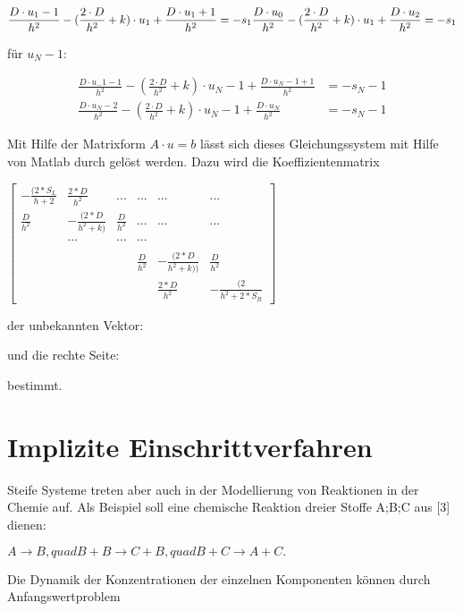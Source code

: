 \begin{equation}
	\frac{D\cdot u_1-1}{h^2}-(\frac{2\cdot D}{h^2} + k)\cdot u_1  + \frac{D\cdot u_1+1}{h^2} = -s_1\\
	\frac{D\cdot u_0}{h^2}-(\frac{2\cdot D}{h^2} + k)\cdot u_1  + \frac{D\cdot u_2}{h^2} = -s_1\\
\end{equation}

für $ u_N-1$:

\begin{align*}
	\frac{D\cdot u_-1-1}{h^2}-(\frac{2\cdot D}{h^2} + k)\cdot u_N-1  + \frac{D\cdot u_N-1+1}{h^2} &= -s_N-1\\
	\frac{D\cdot u_N-2}{h^2} - (\frac{2\cdot D}{h^2} + k)\cdot u_N-1  + \frac{D\cdot u_N}{h^2} &
	= -s_N-1
\end{align*}

Mit Hilfe der Matrixform $ A\cdot u = b $ lässt sich dieses Gleichungssystem mit Hilfe von Matlab durch  gelöst werden. Dazu wird die Koeffizientenmatrix


$ \begin{bmatrix}
	-\frac{(2*S_L}{h + 2} & \frac{2*D}{h^2} & ... & ... & ... & ... \\
	\frac{D}{h^2} & -\frac{(2*D}{h^2 + k)} & \frac{D}{h^2} & ... & ... & ... \\
	& ... & ... & ... &  &  \\
	&  &  &  &  &  \\
	&  &  & \frac{D}{h^2} & -\frac{(2*D}{h^2 + k))} & \frac{D}{h^2} \\
	&  &  &  & \frac{2*D}{h^2} & -\frac{(2}{h^2 + 2*S_R} 
\end{bmatrix}  $

der unbekannten Vektor:


und die rechte Seite:


bestimmt.


\chapter{Implizite Einschrittverfahren}

Steife Systeme treten aber auch in der Modellierung von Reaktionen in der Chemie auf. Als Beispiel soll
eine chemische Reaktion dreier Stoffe A;B;C aus [3] dienen:

$ A \rightarrow B,quad B + B \rightarrow C+ B,quad B + C \rightarrow A + C. $

Die Dynamik der Konzentrationen der einzelnen Komponenten können durch Anfangswertproblem


